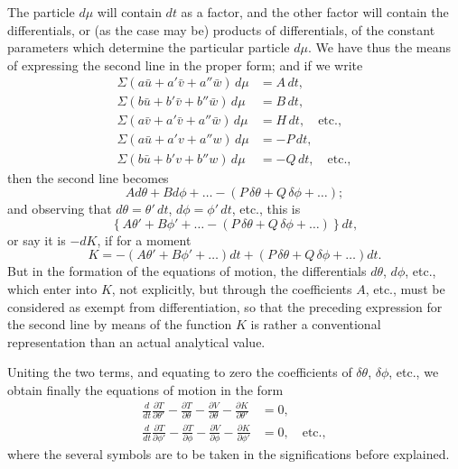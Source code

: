 \documentclass[11pt,a4paper]{book}
\theoremstyle{plain}
\begin{document}
The particle $d\mu$ will contain $dt$ as a factor, and the other factor will contain the differentials, or (as the case may be) products of differentials, of the constant parameters which determine the particular particle $d\mu$. We have thus the means of expressing the second line in the proper form; and if we write
\begin{align*}
\Sigma(a\bar{u}+a'\bar{v}+a''\bar{w})\,d\mu &= A\,dt,\\
\Sigma(b\bar{u}+b'\bar{v}+b''\bar{w})\,d\mu &= B\,dt,\\
\Sigma(a\bar{v}+a'\bar{v}+a''\bar{w})\,d\mu &= H\,dt,\quad \text{etc.},\\
\Sigma(a\bar{u}+a'v+a''w)\,d\mu &= -P\,dt,\\
\Sigma(b\bar{u}+b'v+b''w)\,d\mu &= -Q\,dt,\quad \text{etc.},
\end{align*}
then the second line becomes
\[
Ad\theta+Bd\phi+\ldots
-(P\,\delta\theta+Q\,\delta\phi+\ldots);
\]
and observing that $d\theta=\theta'\,dt$, $d\phi=\phi'\,dt$, etc., this is
\[
\left\{A\theta'+B\phi'+\ldots-(P\,\delta\theta+Q\,\delta\phi+\ldots)\right\}dt,
\]
or say it is $-dK$, if for a moment
\[
K=-(A\theta'+B\phi'+\ldots)dt+(P\,\delta\theta+Q\,\delta\phi+\ldots)dt.
\]
But in the formation of the equations of motion, the differentials $d\theta$, $d\phi$, etc., which enter into $K$, not explicitly, but through the coefficients $A$, etc., must be considered as exempt from differentiation, so that the preceding expression for the second line by means of the function $K$ is rather a conventional representation than an actual analytical value.

Uniting the two terms, and equating to zero the coefficients of $\delta\theta$, $\delta\phi$, etc., we obtain finally the equations of motion in the form
\begin{align}
\frac{d}{dt}\frac{\partial T}{\partial\theta'}-\frac{\partial T}{\partial\theta}-\frac{\partial V}{\partial\theta}-\frac{\partial K}{\partial\theta'} &= 0,\\
\frac{d}{dt}\frac{\partial T}{\partial\phi'}-\frac{\partial T}{\partial\phi}-\frac{\partial V}{\partial\phi}-\frac{\partial K}{\partial\phi'} &= 0,\quad \text{etc.},
\end{align}
where the several symbols are to be taken in the significations before explained.
\end{document}
